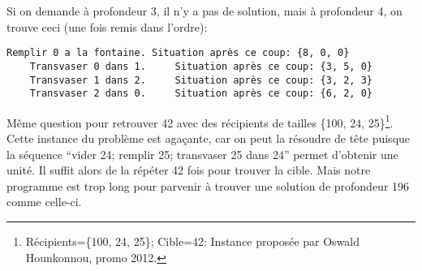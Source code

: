 \documentclass[10pt]{article}\usepackage[correction,nu]{esial}%
\begin{document}
\begin{Reponse}
  Si on demande à profondeur 3, il n'y a pas de solution, mais à profondeur 4,
  on trouve ceci (une fois remis dans l'ordre):
  \begin{Verbatim}[gobble=4]
    Remplir 0 a la fontaine. Situation après ce coup: {8, 0, 0}    
    Transvaser 0 dans 1.     Situation après ce coup: {3, 5, 0}
    Transvaser 1 dans 2.     Situation après ce coup: {3, 2, 3}
    Transvaser 2 dans 0.     Situation après ce coup: {6, 2, 0}
  \end{Verbatim}
\end{Reponse}

\Question Même question pour retrouver 42 avec des récipients de tailles \{100,
24, 25\}\footnote{Récipients=\{100, 24, 25\}; Cible=42: Instance proposée par
  Oswald Hounkonnou, promo 2012.}. Cette instance du problème est agaçante, car
on peut la résoudre de tête puisque la séquence ``vider 24; remplir 25;
transvaser 25 dans 24'' permet d'obtenir une unité. Il suffit alors de la
répéter 42 fois pour trouver la cible. Mais notre programme est trop long pour
parvenir à trouver une solution de profondeur 196 comme celle-ci.
\end{document}
